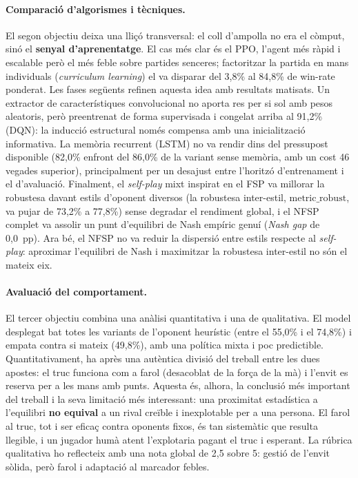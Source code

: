 \paragraph{Comparació d'algorismes i tècniques.} El segon objectiu deixa una lliçó
transversal: el coll d'ampolla no era el còmput, sinó el \textbf{senyal d'aprenentatge}. El
cas més clar és el \ac{PPO}, l'agent més ràpid i escalable però el més feble sobre partides
senceres; factoritzar la partida en mans individuals (\emph{curriculum learning}) el va
disparar del 3{,}8\% al 84{,}8\% de win-rate ponderat. Les fases següents refinen aquesta
idea amb resultats matisats. Un extractor de característiques convolucional no aporta res
per si sol amb pesos aleatoris, però preentrenat de forma supervisada i congelat arriba al
91{,}2\% (\ac{DQN}): la inducció estructural només compensa amb una inicialització
informativa. La memòria recurrent (\ac{LSTM}) no va rendir dins del pressupost disponible
(82{,}0\% enfront del 86{,}0\% de la variant sense memòria, amb un cost 46 vegades superior),
principalment per un desajust entre l'horitzó d'entrenament i el d'avaluació. Finalment, el
\emph{self-play} mixt inspirat en el \ac{FSP} va millorar la robustesa davant estils
d'oponent diversos (la robustesa inter-estil, \(\text{metric\_robust}\), va pujar de
73{,}2\% a 77{,}8\%) sense degradar el rendiment global, i el \ac{NFSP} complet va assolir
un punt d'equilibri de Nash empíric genuí (\emph{Nash gap} de 0{,}0~pp). Ara bé, el \ac{NFSP}
no va reduir la dispersió entre estils respecte al \emph{self-play}: aproximar l'equilibri de
Nash i maximitzar la robustesa inter-estil no són el mateix eix.

\paragraph{Avaluació del comportament.} El tercer objectiu combina una anàlisi quantitativa
i una de qualitativa. El model desplegat bat totes les variants de l'oponent heurístic
(entre el 55{,}0\% i el 74{,}8\%) i empata contra si mateix (49{,}8\%), amb una política
mixta i poc predictible. Quantitativament, ha après una autèntica divisió del treball entre
les dues apostes: el truc funciona com a farol (desacoblat de la força de la mà) i l'envit
es reserva per a les mans amb punts. Aquesta és, alhora, la conclusió més important del
treball i la seva limitació més interessant: una proximitat estadística a l'equilibri
\textbf{no equival} a un rival creïble i inexplotable per a una persona. El farol al truc,
tot i ser eficaç contra oponents fixos, és tan sistemàtic que resulta llegible, i un jugador
humà atent l'explotaria pagant el truc i esperant. La rúbrica qualitativa ho reflecteix amb
una nota global de 2{,}5 sobre 5: gestió de l'envit sòlida, però farol i adaptació al
marcador febles.


